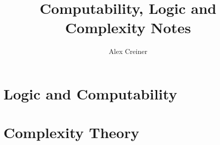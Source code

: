 \documentclass{article}
\title{Computability, Logic and Complexity Notes}
\author{Alex Creiner}
\date{}
\theoremstyle{definition}
\theoremstyle{plain}
\theoremstyle{theorem}
\begin{document}
\maketitle

\tableofcontents

\newpage
\part{Logic and Computability}








\part{Complexity Theory}








% 


\appendix



\printbibliography

\iffalse
\end{document}
